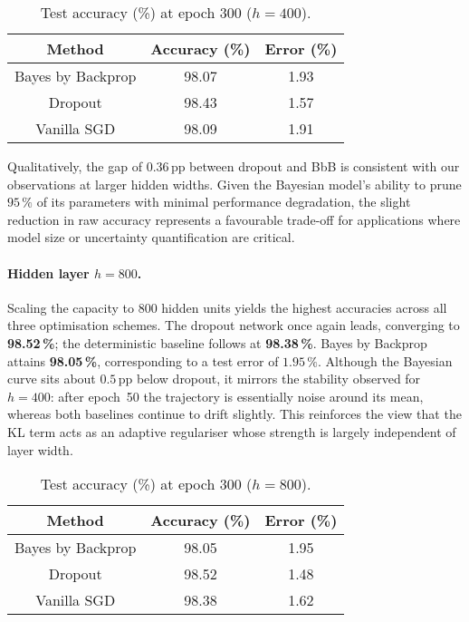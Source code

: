 \documentclass{article}
\begin{document}
\begin{table}[h]
\centering
\caption{Test accuracy (\%) at epoch 300 ($h=400$).}
\label{tab:acc-400}
\begin{tabular}{ccc}
\toprule
Method & Accuracy (\%) & Error (\%) \\
\midrule
Bayes by Backprop & 98.07 & 1.93 \\
Dropout           & 98.43 & 1.57 \\
Vanilla SGD       & 98.09 & 1.91 \\
\bottomrule
\end{tabular}
\end{table}

Qualitatively, the gap of $0.36$\,pp between dropout and BbB is consistent with our observations at larger hidden widths.  
Given the Bayesian model’s ability to prune $95\,\%$ of its parameters with minimal performance degradation, the slight reduction in raw accuracy represents a favourable trade-off for applications where model size or uncertainty quantification are critical.

\paragraph{Hidden layer $h=800$.}
Scaling the capacity to $800$ hidden units yields the highest accuracies across all three optimisation schemes.  
The dropout network once again leads, converging to \textbf{98.52\,\%}; the deterministic baseline follows at \textbf{98.38\,\%}.  
Bayes by Backprop attains \textbf{98.05\,\%}, corresponding to a test error of $1.95\,\%$.  
Although the Bayesian curve sits about $0.5$\,pp below dropout, it mirrors the stability observed for $h=400$: after epoch~50 the trajectory is essentially noise around its mean, whereas both baselines continue to drift slightly.  This reinforces the view that the KL term acts as an adaptive regulariser whose strength is largely independent of layer width.

\begin{table}[h]
\centering
\caption{Test accuracy (\%) at epoch 300 ($h=800$).}
\label{tab:acc-800}
\begin{tabular}{ccc}
\toprule
Method & Accuracy (\%) & Error (\%) \\
\midrule
Bayes by Backprop & 98.05 & 1.95 \\
Dropout           & 98.52 & 1.48 \\
Vanilla SGD       & 98.38 & 1.62 \\
\bottomrule
\end{tabular}
\end{table}
\end{document}
